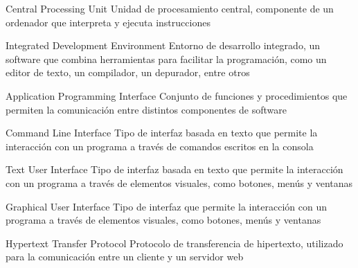 





{Central Processing Unit}
{Unidad de procesamiento central, componente de un ordenador que interpreta y ejecuta instrucciones}


{Integrated Development Environment}
{Entorno de desarrollo integrado, un software que combina herramientas para facilitar la programación, como un editor de texto, un compilador, un depurador, entre otros}

{Application Programming Interface}
{Conjunto de funciones y procedimientos que permiten la comunicación entre distintos componentes de software}


{Command Line Interface}
{Tipo de interfaz basada en texto que permite la interacción con un programa a través de comandos escritos en la consola}

{Text User Interface}
{Tipo de interfaz basada en texto que permite la interacción con un programa a través de elementos visuales, como botones, menús y ventanas}

{Graphical User Interface}
{Tipo de interfaz que permite la interacción con un programa a través de elementos visuales, como botones, menús y ventanas}

{Hypertext Transfer Protocol}
{Protocolo de transferencia de hipertexto, utilizado para la comunicación entre un cliente y un servidor web}